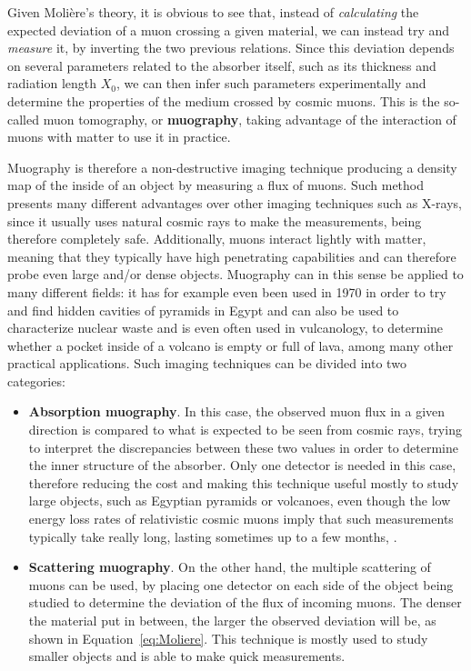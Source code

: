 \documentclass[a4paper, 11pt]{report}
\begin{document}
Given Moli\`ere's theory, it is obvious to see that, instead of \textit{calculating} the expected deviation of a muon crossing a given material, we can instead try and \textit{measure} it, by inverting the two previous relations. Since this deviation depends on several parameters related to the absorber itself, such as its thickness and radiation length $X_0$, we can then infer such parameters experimentally and determine the properties of the medium crossed by cosmic muons. This is the so-called muon tomography, or \textbf{muography}, taking advantage of the interaction of muons with matter to use it in practice.

Muography is therefore a non-destructive imaging technique producing a density map of the inside of an object by measuring a flux of muons. Such method presents many different advantages over other imaging techniques such as X-rays, since it usually uses natural cosmic rays to make the measurements, being therefore completely safe. Additionally, muons interact lightly with matter, meaning that they typically have high penetrating capabilities and can therefore probe even large and/or dense objects. Muography can in this sense be applied to many different fields: it has for example even been used in 1970 in order to try and find hidden cavities of pyramids in Egypt \cite{Egypt} and can also be used to characterize nuclear waste and is even often used in vulcanology, to determine whether a pocket inside of a volcano is empty or full of lava, among many other practical applications.
\newpage
Such imaging techniques can be divided into two categories:
\begin{itemize}
\item \textbf{Absorption muography}. In this case, the observed muon flux in a given direction is compared to what is expected to be seen from cosmic rays, trying to interpret the discrepancies between these two values in order to determine the inner structure of the absorber. Only one detector is needed in this case, therefore reducing the cost and making this technique useful mostly to study large objects, such as Egyptian pyramids or volcanoes, even though the low energy loss rates of relativistic cosmic muons imply that such measurements typically take really long, lasting sometimes up to a few months, .
\item \textbf{Scattering muography}. On the other hand, the multiple scattering of muons can be used, by placing one detector on each side of the object being studied to determine the deviation of the flux of incoming muons. The denser the material put in between, the larger the observed deviation will be, as shown in Equation~\ref{eq:Moliere}. This technique is mostly used to study smaller objects and is able to make quick measurements.
\end{itemize}
\end{document}
